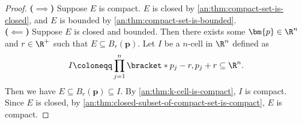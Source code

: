 \begin{proof}
  \textbf{($\implies$)} Suppose $E$ is compact. $E$ is closed by \cref{an:thm:compact-set-is-closed}, and $E$ is
  bounded by \cref{an:thm:compact-set-is-bounded}.
  \\[6mm]
  \textbf{($\impliedby$)} Suppose $E$ is closed and bounded. Then there exists some $\bm{p} \in \R^{n}$ and
  $r \in \R^{+}$ such that $E \subseteq B_{r}(\bm{p})$. Let $I$ be a $n$-cell in $\R^{n}$ defined as
  \[
    I \coloneqq \prod_{j = 1}^{n} \bracket*{p_{j} - r, p_{j} + r} \subseteq \R^{n}.
  \]
  Then we have $E \subseteq B_{r}(\bm{p}) \subseteq I$. By \cref{an:thm:k-cell-is-compact}, $I$ is compact.
  Since $E$ is closed, by \cref{an:thm:closed-subset-of-compact-set-is-compact}, $E$ is compact.
\end{proof}
